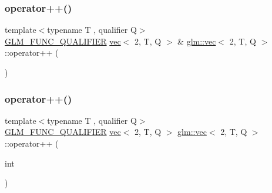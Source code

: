 \mbox{\label{structglm_1_1vec_3_012_00_01_t_00_01_q_01_4_a3b86debb295909f1369aebf4b9a834ab}} 
\subsubsection{\texorpdfstring{operator++()}{operator++()}\hspace{0.1cm}{\footnotesize\ttfamily [1/2]}}
{\footnotesize\ttfamily template$<$typename T , qualifier Q$>$ \\
\hyperlink{setup_8hpp_a33fdea6f91c5f834105f7415e2a64407}{G\+L\+M\+\_\+\+F\+U\+N\+C\+\_\+\+Q\+U\+A\+L\+I\+F\+I\+ER} \hyperlink{structglm_1_1vec}{vec}$<$ 2, T, Q $>$ \& \hyperlink{structglm_1_1vec}{glm\+::vec}$<$ 2, T, Q $>$\+::operator++ (\begin{DoxyParamCaption}{ }\end{DoxyParamCaption})}

\mbox{\label{structglm_1_1vec_3_012_00_01_t_00_01_q_01_4_ab6bd7fc778f3585723da44341d9d5c37}} 
\subsubsection{\texorpdfstring{operator++()}{operator++()}\hspace{0.1cm}{\footnotesize\ttfamily [2/2]}}
{\footnotesize\ttfamily template$<$typename T , qualifier Q$>$ \\
\hyperlink{setup_8hpp_a33fdea6f91c5f834105f7415e2a64407}{G\+L\+M\+\_\+\+F\+U\+N\+C\+\_\+\+Q\+U\+A\+L\+I\+F\+I\+ER} \hyperlink{structglm_1_1vec}{vec}$<$ 2, T, Q $>$ \hyperlink{structglm_1_1vec}{glm\+::vec}$<$ 2, T, Q $>$\+::operator++ (\begin{DoxyParamCaption}\item[{int}]{ }\end{DoxyParamCaption})}

\mbox{\label{structglm_1_1vec_3_012_00_01_t_00_01_q_01_4_a85009f198924c17e5830290e55c04323}} 
